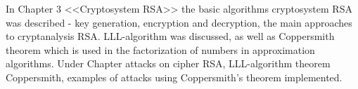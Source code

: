 In Chapter 3 <<Cryptosystem RSA>> the basic algorithms cryptosystem RSA was described - key generation, encryption and decryption, the main
approaches to cryptanalysis RSA. LLL-algorithm was discussed, as well as Coppersmith theorem which is used in the factorization of numbers in 
approximation algorithms. Under Chapter attacks on cipher RSA, LLL-algorithm theorem Coppersmith, exampl\-es of attacks using Coppersmith's theorem implemented.